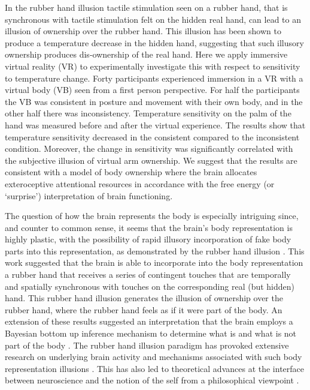 \documentclass[
		twoside,openright,titlepage,numbers=noenddot,manychapters,
		headinclude,%
                footinclude=false,cleardoublepage=empty,
                BCOR=5mm,
		fontsize=11pt, %
                 enabledeprecatedfontcommands]{scrreprt}
\begin{document}
In the rubber hand illusion tactile stimulation seen on a rubber hand, that is synchronous with tactile stimulation felt on the hidden real hand, can lead to an illusion of ownership over the rubber hand. This illusion has been shown to produce a temperature decrease in the hidden hand, suggesting that such illusory ownership produces dis-ownership of the real hand. Here we apply immersive virtual reality (VR) to experimentally investigate this with respect to sensitivity to temperature change. Forty participants experienced immersion in a VR with a virtual body (VB) seen from a first person perspective. For half the participants the VB was consistent in posture and movement with their own body, and in the other half there was inconsistency.  Temperature sensitivity on the palm of the hand was measured before and after the virtual experience. The results show that temperature sensitivity decreased in the consistent compared to the inconsistent condition. Moreover, the change in sensitivity was significantly correlated with the subjective illusion of virtual arm ownership.  We suggest that the results are consistent with a model of body ownership where the brain allocates exteroceptive attentional resources in accordance with the free energy (or ‘surprise’) interpretation of brain functioning.  

The question of how the brain represents the body is especially intriguing since, and counter to common sense, it seems that the brain’s body representation is highly plastic, with the possibility of rapid illusory incorporation of fake body parts into this representation, as demonstrated by the rubber hand illusion 
\cite[]{Botvinick1998}. This work suggested that the brain is able to incorporate into the body representation a rubber hand that receives a series of contingent touches that are temporally and spatially synchronous with touches on the corresponding real (but hidden) hand. This rubber hand illusion generates the illusion of ownership over the rubber hand, where the rubber hand feels as if it were part of the body. An extension of these results suggested an interpretation that the brain employs a Bayesian bottom up inference mechanism to determine what is and what is not part of the body  \cite[]{Armel2003}. The rubber hand illusion paradigm has provoked extensive research on underlying brain activity and mechanisms associated with such body representation illusions \cite[]{Blanke2005a, Ehrsson2007c, Ehrsson2005, Tsakiris_2010}. This has also led to theoretical advances at the interface between neuroscience and the notion of the self from a philosophical viewpoint \cite[]{Blanke2009}.
\end{document}
